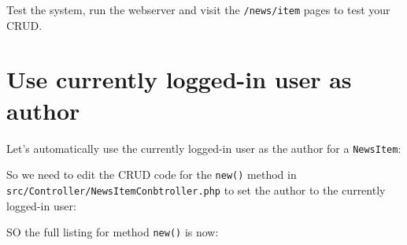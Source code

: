 \documentclass[a4paperpaper,openright]{book}
\newenvironment{Shaded}{}{}
\newcommand{\KeywordTok}[1]{\textcolor[rgb]{0.00,0.44,0.13}{\textbf{#1}}}
\newcommand{\NormalTok}[1]{#1}
\newcommand{\OtherTok}[1]{\textcolor[rgb]{0.00,0.44,0.13}{#1}}
\begin{document}
Test the system, run the webserver and visit the \texttt{/news/item}
pages to test your CRUD.

\hypertarget{use-currently-logged-in-user-as-author}{%
\section{Use currently logged-in user as
author}\label{use-currently-logged-in-user-as-author}}

Let's automatically use the currently logged-in user as the author for a
\texttt{NewsItem}:

\begin{Shaded}
\end{Shaded}

So we need to edit the CRUD code for the \texttt{new()} method in
\texttt{src/Controller/NewsItemConbtroller.php} to set the author to the
currently logged-in user:

\begin{Shaded}
\end{Shaded}

SO the full listing for method \texttt{new()} is now:
\end{document}
